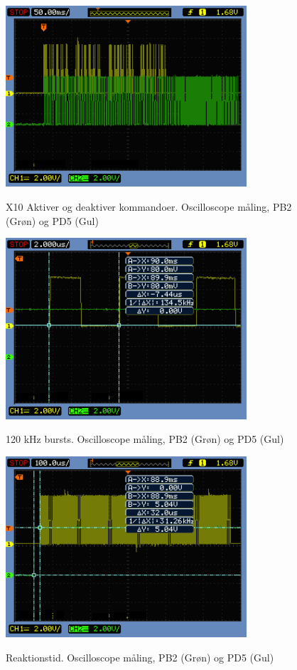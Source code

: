 \begin{figure}[!htb]
	\centering
     {\includegraphics[width=0.8\textwidth]{billeder/SWTest/X10IF_Test_Afsend_2_kommandoer}}
     \caption{X10 Aktiver og deaktiver kommandoer. Oscilloscope måling, PB2 (Grøn) og PD5 (Gul)}
     \label{fig:Test_CSS_ZeroCross_sender2}
\end{figure}

\begin{figure}[!htb]
	\centering
     {\includegraphics[width=0.8\textwidth]{billeder/SWTest/X10IF_Test_Burst}}
     \caption{120 kHz bursts. Oscilloscope måling, PB2 (Grøn) og PD5 (Gul)}
     \label{fig:Test_CSS_ZeroCross_Bursts}
\end{figure}

\begin{figure}[!htb]
	\centering
     {\includegraphics[width=0.8\textwidth]{billeder/SWTest/X10IF_Test_Delay}}
     \caption{Reaktionstid. Oscilloscope måling, PB2 (Grøn) og PD5 (Gul)}
     \label{fig:Test_CSS_ZeroCross_Delay}
\end{figure}